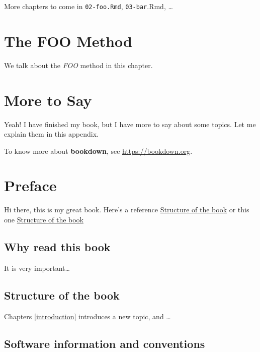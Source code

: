 \documentclass[
]{krantz}
\begin{document}
More chapters to come in \texttt{02-foo.Rmd}, \texttt{03-bar}.Rmd, \ldots{}

\hypertarget{the-foo-method}{%
\chapter{The FOO Method}\label{the-foo-method}}

We talk about the \emph{FOO} method in this chapter.

\cleardoublepage

\hypertarget{appendix-appendix}{%
\appendix {}}


\hypertarget{more-to-say}{%
\chapter{More to Say}\label{more-to-say}}

Yeah! I have finished my book, but I have more to say about some topics. Let me explain them in this appendix.

To know more about \textbf{bookdown}, see \url{https://bookdown.org}.

\hypertarget{preface-1}{%
\chapter*{Preface}\label{preface-1}}


Hi there, this is my great book. Here's a reference \protect\hyperlink{structure-of-the-book-1}{Structure of the book} or this one \protect\hyperlink{structure-of-the-book-1}{Structure of the book}

\hypertarget{why-read-this-book-1}{%
\section*{Why read this book}\label{why-read-this-book-1}}


It is very important\ldots{}

\hypertarget{structure-of-the-book-1}{%
\section*{Structure of the book}\label{structure-of-the-book-1}}


Chapters \ref{introduction} introduces a new topic, and \ldots{}

\hypertarget{software-information-and-conventions}{%
\section*{Software information and conventions}\label{software-information-and-conventions}}
\end{document}
